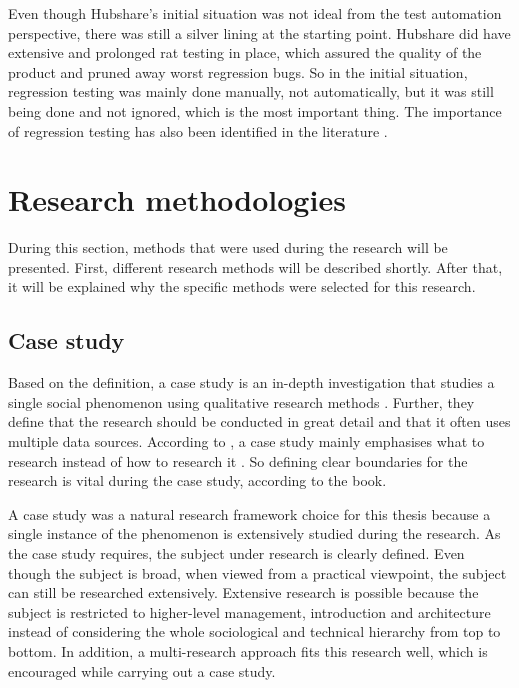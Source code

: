 Even though Hubshare's initial situation was not ideal from the test automation perspective, there was still a silver lining at the starting point. Hubshare did have extensive and prolonged \gls{rat} testing in place, which assured the quality of the product and pruned away worst regression bugs. So in the initial situation, regression testing was mainly done manually, not automatically, but it was still being done and not ignored, which is the most important thing. The importance of regression testing has also been identified in the literature \cite{onoma1998regression}.

\section{Research methodologies}
During this section, methods that were used during the research will be presented. First, different research methods will be described shortly. After that, it will be explained why the specific methods were selected for this research.

\subsection{Case study}
Based on the \citeauthor{feagin1991case} definition, a case study is an in-depth investigation that studies a single social phenomenon using qualitative research methods \cite{feagin1991case}. Further, they define that the research should be conducted in great detail and that it often uses multiple data sources. According to \citeauthor{flyvbjerg2011case}, a case study mainly emphasises what to research instead of how to research it \cite{flyvbjerg2011case}. So defining clear boundaries for the research is vital during the case study, according to the book.

A case study was a natural research framework choice for this thesis because a single instance of the phenomenon is extensively studied during the research. As the case study requires, the subject under research is clearly defined. Even though the subject is broad, when viewed from a practical viewpoint, the subject can still be researched extensively. Extensive research is possible because the subject is restricted to higher-level management, introduction and architecture instead of considering the whole sociological and technical hierarchy from top to bottom. In addition, a multi-research approach fits this research well, which is encouraged while carrying out a case study.

